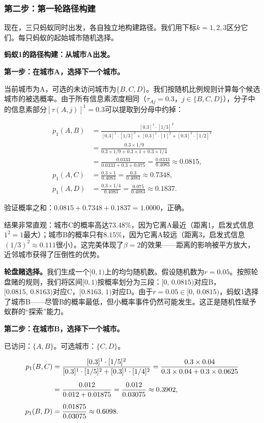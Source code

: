 \documentclass[lang=cn,zihao=-4,a4paper,fontset=windows]{beautybook}
\begin{document}
\subsubsection{第二步：第一轮路径构建}

现在，三只蚂蚁同时出发，各自独立地构建路径。我们用下标$k=1,2,3$区分它们。每只蚂蚁的起始城市随机选择。

\textbf{蚂蚁1的路径构建：从城市A出发。}

\textbf{第一步：在城市A，选择下一个城市。}

当前城市为A，可选的未访问城市为$\{B, C, D\}$。我们按随机比例规则计算每个候选城市的被选概率。由于所有信息素浓度相同（$\tau_{Aj}=0.3$，$j \in \{B,C,D\}$），分子中的信息素部分$[\tau(A,j)]^1 = 0.3$可以提取到分母中约掉：

\begin{align*}
p_1(A,B) &= \frac{[0.3]^1 \cdot [1/3]^2}{[0.3]^1 \cdot [1/3]^2 + [0.3]^1 \cdot [1]^2 + [0.3]^1 \cdot [1/2]^2} \\[6pt]
&= \frac{0.3 \times 1/9}{0.3 \times 1/9 + 0.3 \times 1 + 0.3 \times 1/4} \\[6pt]
&= \frac{0.0333}{0.0333 + 0.3 + 0.075} = \frac{0.0333}{0.4083} \approx 0.0815, \\[6pt]
p_1(A,C) &= \frac{0.3 \times 1}{0.4083} = \frac{0.3}{0.4083} \approx 0.7348, \\[6pt]
p_1(A,D) &= \frac{0.3 \times 1/4}{0.4083} = \frac{0.075}{0.4083} \approx 0.1837.
\end{align*}

验证概率之和：$0.0815 + 0.7348 + 0.1837 = 1.0000$，正确。

结果非常直观：城市C的概率高达$73.48\%$，因为它离A最近（距离1，启发式信息$1^2=1$最大）；城市B的概率只有$8.15\%$，因为它离A较远（距离3，启发式信息$(1/3)^2 \approx 0.111$很小）。这完美体现了$\beta=2$的效果——距离的影响被平方放大，近邻城市获得了压倒性的优势。

\textbf{轮盘赌选择。}我们生成一个$[0,1)$上的均匀随机数。假设随机数为$r=0.05$。按照轮盘赌的规则，我们将区间$[0,1)$按概率划分为三段：$[0,\, 0.0815)$对应B，$[0.0815,\, 0.8163)$对应C，$[0.8163,\, 1)$对应D。由于$r=0.05 \in [0,\, 0.0815)$，蚂蚁1选择了城市B——尽管B的概率最低，但小概率事件仍然可能发生。这正是随机性赋予蚁群的“探索”能力。

\textbf{第二步：在城市B，选择下一个城市。}

已访问：$\{A, B\}$。可选城市：$\{C, D\}$。

\begin{align*}
p_1(B,C) &= \frac{[0.3]^1 \cdot [1/5]^2}{[0.3]^1 \cdot [1/5]^2 + [0.3]^1 \cdot [1/4]^2} = \frac{0.3 \times 0.04}{0.3 \times 0.04 + 0.3 \times 0.0625} \notag \\[6pt]
&= \frac{0.012}{0.012 + 0.01875} = \frac{0.012}{0.03075} \approx 0.3902, \\[6pt]
p_1(B,D) &= \frac{0.01875}{0.03075} \approx 0.6098.
\end{align*}
\end{document}
